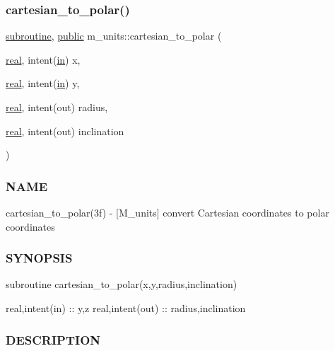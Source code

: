 \mbox{\label{namespacem__units_a283a11d968cad968e33abfd6889de689}} 
\subsubsection{\texorpdfstring{cartesian\+\_\+to\+\_\+polar()}{cartesian\_to\_polar()}}
{\footnotesize\ttfamily \hyperlink{M__stopwatch_83_8txt_acfbcff50169d691ff02d4a123ed70482}{subroutine}, \hyperlink{M__stopwatch_83_8txt_a2f74811300c361e53b430611a7d1769f}{public} m\+\_\+units\+::cartesian\+\_\+to\+\_\+polar (\begin{DoxyParamCaption}\item[{\hyperlink{read__watch_83_8txt_abdb62bde002f38ef75f810d3a905a823}{real}, intent(\hyperlink{M__journal_83_8txt_afce72651d1eed785a2132bee863b2f38}{in})}]{x,  }\item[{\hyperlink{read__watch_83_8txt_abdb62bde002f38ef75f810d3a905a823}{real}, intent(\hyperlink{M__journal_83_8txt_afce72651d1eed785a2132bee863b2f38}{in})}]{y,  }\item[{\hyperlink{read__watch_83_8txt_abdb62bde002f38ef75f810d3a905a823}{real}, intent(out)}]{radius,  }\item[{\hyperlink{read__watch_83_8txt_abdb62bde002f38ef75f810d3a905a823}{real}, intent(out)}]{inclination }\end{DoxyParamCaption})}



\subsubsection*{N\+A\+ME}

cartesian\+\_\+to\+\_\+polar(3f) -\/ \mbox{[}M\+\_\+units\mbox{]} convert Cartesian coordinates to polar coordinates \subsubsection*{S\+Y\+N\+O\+P\+S\+IS}

subroutine cartesian\+\_\+to\+\_\+polar(x,y,radius,inclination)

real,intent(in) \+:\+: y,z real,intent(out) \+:\+: radius,inclination

\subsubsection*{D\+E\+S\+C\+R\+I\+P\+T\+I\+ON}

